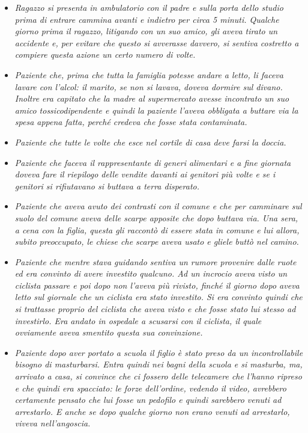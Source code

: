 \begin{itemize}
\item
  \emph{Ragazzo si presenta in ambulatorio con il padre e sulla porta
  dello studio prima di entrare cammina avanti e indietro per circa 5
  minuti. Qualche giorno prima il ragazzo, litigando con un suo amico,
  gli aveva tirato un accidente e, per evitare che questo si avverasse
  davvero, si sentiva costretto a compiere questa azione un certo numero
  di volte.}
\item
  \emph{Paziente che, prima che tutta la famiglia potesse andare a
  letto, li faceva lavare con l'alcol: il marito, se non si lavava,
  doveva dormire sul divano. Inoltre era capitato che la madre al
  supermercato avesse incontrato un suo amico tossicodipendente e quindi
  la paziente l'aveva obbligata a buttare via la spesa appena fatta,
  perché credeva che fosse stata contaminata.}
\item
  \emph{Paziente che tutte le volte che esce nel cortile di casa deve
  farsi la doccia.}
\item
  \emph{Paziente che faceva il rappresentante di generi alimentari e a
  fine giornata doveva fare il riepilogo delle vendite davanti ai
  genitori più volte e se i genitori si rifiutavano si buttava a terra
  disperato.}
\item
  \emph{Paziente che aveva avuto dei contrasti con il comune e che per
  camminare sul suolo del comune aveva delle scarpe apposite che dopo
  buttava via. Una sera, a cena con la figlia, questa gli raccontò di
  essere stata in comune e lui allora, subito preoccupato, le chiese che
  scarpe aveva usato e gliele buttò nel camino.}
\item
  \emph{Paziente che mentre stava guidando sentiva un rumore provenire
  dalle ruote ed era convinto di avere investito qualcuno. Ad un
  incrocio aveva visto un ciclista passare e poi dopo non l'aveva più
  rivisto, finché il giorno dopo aveva letto sul giornale che un
  ciclista era stato investito. Si era convinto quindi che si trattasse
  proprio del ciclista che aveva visto e che fosse stato lui stesso ad
  investirlo. Era andato in ospedale a scusarsi con il ciclista, il
  quale ovviamente aveva smentito questa sua convinzione. }
\item
  \emph{Paziente dopo aver portato a scuola il figlio è stato preso da
  un incontrollabile bisogno di masturbarsi. Entra quindi nei bagni
  della scuola e si masturba, ma, arrivato a casa, si convince che ci
  fossero delle telecamere che l'hanno ripreso e che quindi era
  spacciato: le forze dell'ordine, vedendo il video, avrebbero
  certamente pensato che lui fosse un pedofilo e quindi sarebbero venuti
  ad arrestarlo. E anche se dopo qualche giorno non erano venuti ad
  arrestarlo, viveva nell'angoscia. }
\end{itemize}

